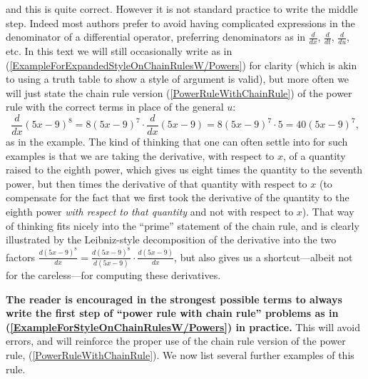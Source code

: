 and this is quite correct.  However it is not standard practice to
write the middle step.  Indeed most authors prefer to avoid
having complicated expressions in the denominator of a
differential operator, preferring denominators as in
$\frac{d}{dx}$, $\frac{d}{dt}$, $\frac{d}{du}$,
etc.  In this text we will still occasionally 
write as in (\ref{ExampleForExpandedStyleOnChainRulesW/Powers})
for clarity (which is akin to using a truth table
to show a style of argument is valid), 
but more often we will just state the
chain rule version (\ref{PowerRuleWithChainRule})  of the power rule with the 
correct terms in place of the general $u$:
\begin{equation}\frac{d}{dx}(5x-9)^8=8(5x-9)^7\cdot\frac{d}{dx}(5x-9)
=8(5x-9)^7\cdot5=40(5x-9)^7,\label{ExampleForStyleOnChainRulesW/Powers}
\end{equation}
as in the example.  The kind of thinking that one can often settle
into for such examples is that we are taking the derivative,
with respect to $x$, of
a quantity raised to the eighth power, which gives us
eight times the quantity to the seventh power, but then times
the derivative of that quantity with respect to $x$ (to compensate
for the fact that we first took the derivative of the quantity
to the eighth power {\it with respect to that quantity} and
not with respect to $x$).  That way of thinking fits nicely into
the ``prime'' statement of the chain rule, and is clearly illustrated
by the Leibniz-style decomposition of the derivative into the
two factors $\frac{d(5x-9)^8}{dx}=
\frac{d(5x-9)^8}{d(5x-9)}\cdot \frac{d(5x-9)}{dx}$, but also
gives us a shortcut---albeit not for the careless---for
computing these derivatives.

{\bf The reader is encouraged in the strongest possible terms to 
always write the first step of ``power rule with chain rule''
problems as in (\ref{ExampleForStyleOnChainRulesW/Powers})
in practice.}  This will avoid errors, and will reinforce
the proper use of the chain rule version of the
power rule, (\ref{PowerRuleWithChainRule}).
We now list several further examples of this rule.

